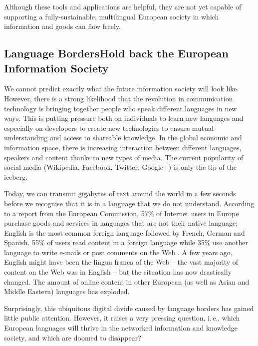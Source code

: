 \documentclass[]{../../metanetpaper}
\begin{document}
\begin{multicols}{2}
Although these tools and applications are helpful, they are not yet capable of supporting a fully-sustainable, multilingual European society in which information and goods can flow freely.

\subsection[Language Borders Hold back the European Information Society]{Language Borders\newline Hold back the European Information Society}

We cannot predict exactly what the future information society will look like. However, there is a strong likelihood that the revolution in communication technology is bringing together people who speak different languages in new ways. This is putting pressure both on individuals to learn new languages and especially on developers to create new technologies to ensure mutual understanding and access to shareable knowledge. In the global economic and information space, there is increasing interaction between different languages, speakers and content thanks to new types of media. The current popularity of social media (Wikipedia, Facebook, Twitter, Google+) is only the tip of the iceberg.


Today, we can transmit gigabytes of text around the world in a few seconds before we recognise that it is in a language that we do not understand. According to a report from the European Commission, 57\% of Internet users in Europe purchase goods and services in languages that are not their native language; English is the most common foreign language followed by French, German and Spanish. 55\% of users read content in a foreign language while 35\% use another language to write e-mails or post comments on the Web \cite{EC1}. A few years ago, English might have been the lingua franca of the Web -- the vast majority of content on the Web was in English -- but the situation has now drastically changed. The amount of online content in other European (as well as Asian and Middle Eastern) languages has exploded.

Surprisingly, this ubiquitous digital divide caused by language borders has gained little public attention. However, it raises a very pressing question, i.\,e., which European languages will thrive in the networked information and knowledge society, and which are doomed to disappear?


\end{multicols}
\end{document}
